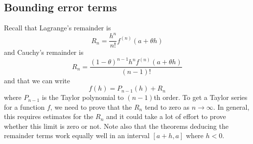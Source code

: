 \subsection{Bounding error terms}
Recall that Lagrange's remainder is
\[
	R_n = \frac{h^n}{n!}f^{(n)}(a + \theta h)
\]
and Cauchy's remainder is
\[
	R_n = \frac{(1 - \theta)^{n-1}h^n f^{(n)}(a + \theta h)}{(n-1)!}
\]
and that we can write
\[
	f(h) = P_{n-1}(h) + R_n
\]
where \(P_{n-1}\) is the Taylor polynomial to \((n-1)\)th order.
To get a Taylor series for a function \(f\), we need to prove that the \(R_n\) tend to zero as \(n \to \infty\).
In general, this requires estimates for the \(R_n\) and it could take a lot of effort to prove whether this limit is zero or not.
Note also that the theorems deducing the remainder terms work equally well in an interval \([a+h, a]\) where \(h < 0\).


